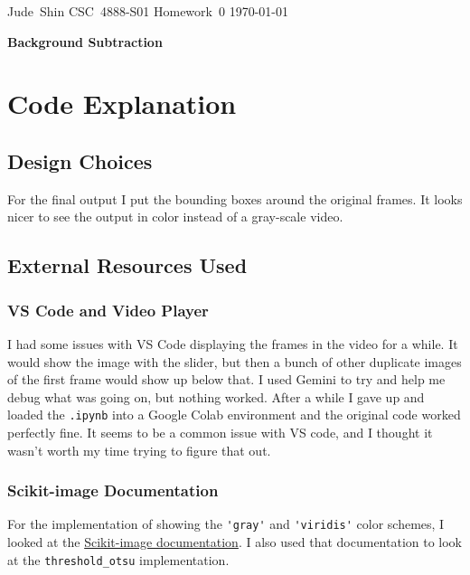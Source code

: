 \documentclass[11pt]{article}
\begin{document}
\hfill\vbox{\hbox{Jude Shin}
		\hbox{CSC 4888-S01}	
		\hbox{Homework 0}	
		\hbox{\today}}\par

\bigskip
\centerline{\Large\bf Background Subtraction}\par
\bigskip

\section{Code Explanation}

\subsection{Design Choices}

For the final output I put the bounding boxes around the original frames.
It looks nicer to see the output in color instead of a gray-scale video. 

\subsection{External Resources Used}

\subsubsection{VS Code and Video Player}

I had some issues with VS Code displaying the frames in the video for a while.
It would show the image with the slider, but then a bunch of other duplicate images of the first frame would show up below that.
I used Gemini to try and help me debug what was going on, but nothing worked.
After a while I gave up and loaded the \lstinline{.ipynb} into a Google Colab environment and the original code worked perfectly fine.
It seems to be a common issue with VS code, and I thought it wasn't worth my time trying to figure that out.

\subsubsection{Scikit-image Documentation}

For the implementation of showing the \lstinline{'gray'} and \lstinline{'viridis'} color schemes, I looked at the \href{https://scikit-image.org/docs/0.23.x/auto_examples/segmentation/plot_thresholding.html}{Scikit-image documentation}.
I also used that documentation to look at the \lstinline{threshold_otsu} implementation.
\end{document}
